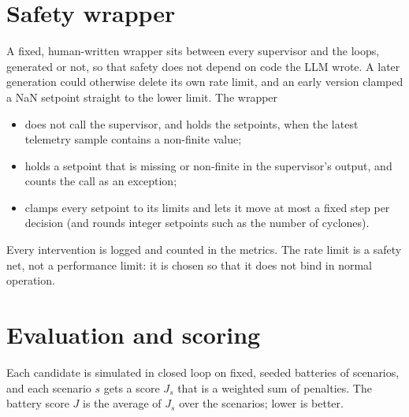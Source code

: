 \section{Safety wrapper}
\label{sec:wrapper}
A fixed, human-written
wrapper sits between every supervisor and the loops, generated or not, so
that safety does not depend on code the LLM wrote. A later generation could
otherwise delete its own rate limit, and an early version clamped a NaN
setpoint straight to the lower limit. The wrapper
\begin{itemize}
\item does not call the supervisor, and holds the setpoints, when the latest
  telemetry sample contains a non-finite value;
\item holds a setpoint that is missing or non-finite in the supervisor's
  output, and counts the call as an exception;
\item clamps every setpoint to its limits and lets it move at most a fixed
  step per decision (and rounds integer setpoints such as the number of
  cyclones).
\end{itemize}
Every intervention is logged and counted in the metrics. The rate limit is a
safety net, not a performance limit: it is chosen so that it does not bind in
normal operation.

\section{Evaluation and scoring}
\label{sec:scoring}
Each candidate is simulated in closed loop on fixed, seeded batteries of
scenarios, and each scenario $s$ gets a score $J_s$ that is a weighted sum of
penalties. The battery score $J$ is the average of $J_s$ over the scenarios;
lower is better.

